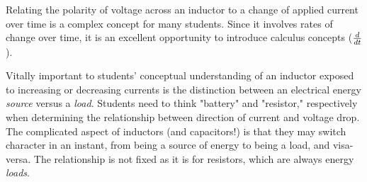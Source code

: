 
Relating the polarity of voltage across an inductor to a change of applied current over time is a complex concept for many students.  Since it involves rates of change over time, it is an excellent opportunity to introduce calculus concepts (${d \over dt}$).

Vitally important to students' conceptual understanding of an inductor exposed to increasing or decreasing currents is the distinction between an electrical energy {\it source} versus a {\it load}.  Students need to think "battery" and "resistor," respectively when determining the relationship between direction of current and voltage drop.  The complicated aspect of inductors (and capacitors!) is that they may switch character in an instant, from being a source of energy to being a load, and visa-versa.  The relationship is not fixed as it is for resistors, which are always energy {\it loads}.




